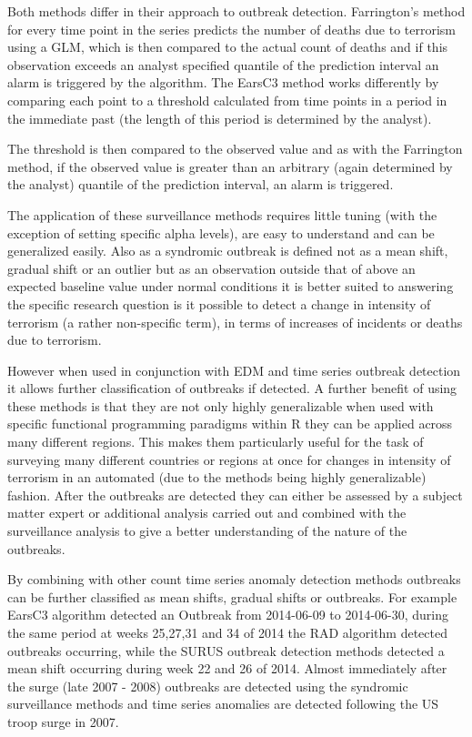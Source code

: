 Both methods differ in their approach to outbreak detection. Farrington’s method for every time point in the series predicts the number of deaths due to terrorism using a GLM, which is then compared to the actual count of deaths and if this observation exceeds an analyst specified quantile of the prediction interval an alarm is triggered by the algorithm. The EarsC3 method works differently by comparing each point to a threshold calculated from time points in a period in the immediate past (the length of this period is determined by the analyst). 

The threshold is then compared to the observed value and as with the Farrington method, if the observed value is greater than an arbitrary (again determined by the analyst) quantile of the prediction interval, an alarm is triggered.  

The application of these surveillance methods requires little tuning (with the exception of setting specific alpha levels), are easy to understand and can be generalized easily. Also as a syndromic outbreak is defined not as a mean shift, gradual shift or an outlier but as an observation outside that of above an expected baseline value under normal conditions it is better suited to answering the specific research question is it possible to detect a change in intensity of terrorism (a rather non-specific term), in terms of increases of incidents or deaths due to terrorism. 

However when used in conjunction with EDM and time series outbreak detection it allows further classification of outbreaks if detected. A further benefit of using these methods is that they are not only highly generalizable when used with specific functional programming paradigms within R they can be applied across many different regions. This makes them particularly useful for the task of surveying many different countries or regions at once for changes in intensity of terrorism in an automated (due to the methods being highly generalizable) fashion.  After the outbreaks are detected they can either be assessed by a subject matter expert or additional analysis carried out and combined with the surveillance analysis to give a better understanding of the nature of the outbreaks. 

By combining with other count time series anomaly detection methods outbreaks can be further classified as mean shifts, gradual shifts or outbreaks. For example EarsC3 algorithm detected an Outbreak from 2014-06-09 to 2014-06-30, during the same period at weeks 25,27,31 and 34 of 2014 the RAD algorithm detected outbreaks occurring, while the SURUS \citep{kelly2015propagating} outbreak detection methods detected a mean shift occurring during week 22 and 26 of 2014. Almost immediately after the surge (late 2007 - 2008) outbreaks are detected using the syndromic surveillance methods and time series anomalies are detected following the US troop surge in 2007.

